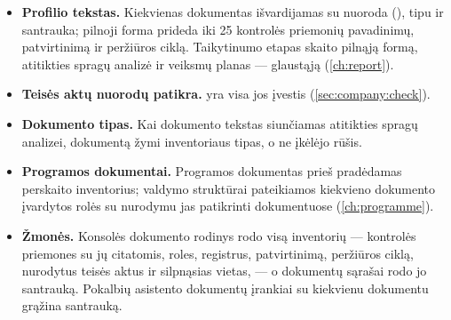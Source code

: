 \begin{itemize}
  \item \textbf{Profilio tekstas.} Kiekvienas dokumentas išvardijamas su nuoroda (\code{[D1]}),
    tipu ir santrauka; pilnoji forma prideda iki 25 kontrolės priemonių pavadinimų,
    patvirtinimą ir peržiūros ciklą. Taikytinumo etapas skaito pilnąją formą, atitikties spragų
    analizė ir veiksmų planas --- glaustąją (\cref{ch:report}).
  \item \textbf{Teisės aktų nuorodų patikra.}  yra visa jos įvestis
    (\cref{sec:company:check}).
  \item \textbf{Dokumento tipas.} Kai dokumento tekstas siunčiamas atitikties spragų analizei,
    dokumentą žymi inventoriaus tipas, o ne įkėlėjo rūšis.
  \item \textbf{Programos dokumentai.} Programos dokumentas prieš pradėdamas perskaito
    inventorius; valdymo struktūrai pateikiamos kiekvieno dokumento įvardytos rolės su nurodymu
    jas patikrinti dokumentuose (\cref{ch:programme}).
  \item \textbf{Žmonės.} Konsolės dokumento rodinys rodo visą inventorių --- kontrolės priemones
    su jų citatomis, roles, registrus, patvirtinimą, peržiūros ciklą, nurodytus teisės aktus ir
    silpnąsias vietas, --- o dokumentų sąrašai rodo jo santrauką. Pokalbių asistento dokumentų
    įrankiai su kiekvienu dokumentu grąžina santrauką.
\end{itemize}

